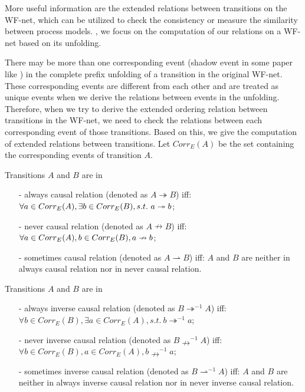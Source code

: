 \documentclass{llncs}
\begin{document}
More useful information are the extended relations between transitions on the WF-net, which can be utilized to check the consistency or measure the similarity between process models. , we focus on the computation of our relations on a WF-net based on its unfolding.

There may be more than one corresponding event (shadow event in some paper like \cite{wang2013efficient}) in the complete prefix unfolding of a transition in the original WF-net. These corresponding events are different from each other and are treated as unique events when we derive the relations between events in the unfolding. Therefore, when we try to derive the extended ordering relation between transitions in the WF-net, we need to check the relations between each corresponding event of those transitions. Based on this, we give the computation of extended relations between transitions. Let $Corr_{E}(A)$ be the set containing the corresponding events of transition $A$.

\begin{definition}\label{def:causalRelations}
Transitions $A$ and $B$ are in
	\begin{itemize}
		\item[-] always causal relation (denoted as $A\twoheadrightarrow B$) iff: $\forall a\in Corr_{E}(A), \exists b\in Corr_{E}(B),\\s.t.~a\twoheadrightarrow b$;
		\item[-] never causal relation (denoted as $A\nrightarrow B$) iff: $\forall a\in Corr_{E}(A), b\in Corr_{E}(B),\\a\nrightarrow b$;
		\item[-] sometimes causal relation (denoted as $A\rightharpoonup B$) iff: $A$ and $B$ are neither in always causal relation nor in never causal relation.
	\end{itemize}
\end{definition}

\begin{definition}\label{def:inverseCausalRelations}
Transitions $A$ and $B$ are in
	\begin{itemize}
		\item[-] always inverse causal relation (denoted as $B\twoheadrightarrow^{-1}A$) iff: $\forall b\in Corr_{E}(B), \exists a\in Corr_{E}(A), s.t.~b\twoheadrightarrow^{-1}a$;
		\item[-] never inverse causal relation (denoted as $B\nrightarrow^{-1}A$) iff: $\forall b\in Corr_{E}(B), a\in Corr_{E}(A), b\nrightarrow^{-1}a$;
		\item[-] sometimes inverse causal relation (denoted as $B\rightharpoonup^{-1}A$) iff: $A$ and $B$ are neither in always inverse causal relation nor in never inverse causal relation.
	\end{itemize}
\end{definition}
\end{document}

